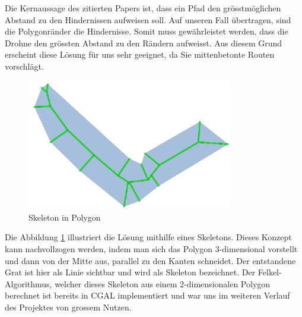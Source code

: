 Die Kernaussage des zitierten Papers \cite[]{SkeletonUAV} ist, dass ein Pfad den grösstmöglichen Abstand zu den Hindernissen aufweisen soll. Auf unseren Fall übertragen, sind die Polygonränder die Hindernisse. Somit muss gewährleistet werden, dass die Drohne den grössten Abstand zu den Rändern aufweisst. Aus diesem Grund erscheint diese Lösung für uns sehr geeignet, da Sie mittenbetonte Routen vorschlägt. \\
\begin{figure}[H]
	\centering
	\includegraphics[width=0.8\textwidth]{images/routing/skeleton.png}
	\caption{Skeleton in Polygon}
	\label{fig:skeleton-in-polygon}
\end{figure}
Die Abbildung \ref{fig:skeleton-in-polygon} illustriert die Lösung mithilfe eines Skeletons. Dieses Konzept kann nachvollzogen werden, indem man sich das Polygon 3-dimensional vorstellt und dann  von der Mitte aus, parallel zu den Kanten schneidet. Der entstandene Grat ist hier als Linie sichtbar und wird als Skeleton bezeichnet. Der Felkel-Algorithmus, welcher dieses Skeleton aus einem 2-dimensionalen Polygon berechnet ist bereits in CGAL implementiert \cite{SkeletonCGAL} und war uns im weiteren Verlauf des Projektes von grossem Nutzen.\\






